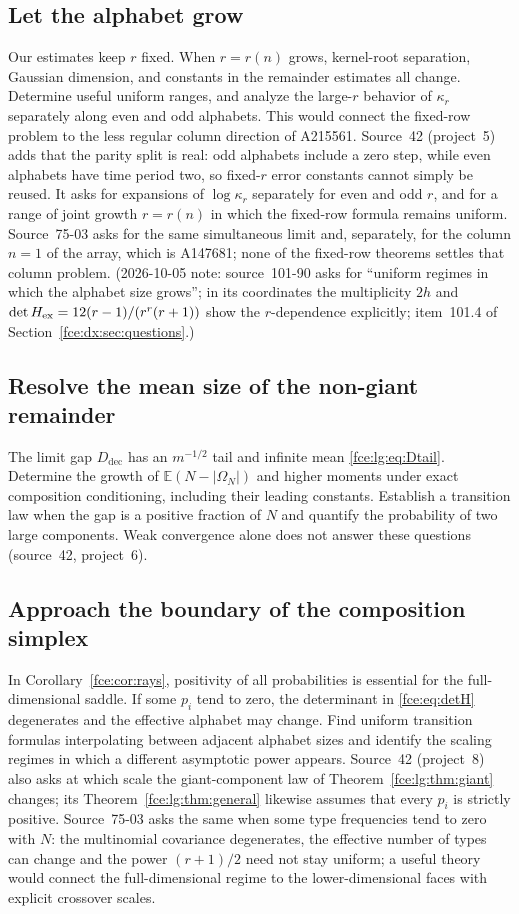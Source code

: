 \documentclass[11pt,a4paper]{article}
\numberwithin{equation}{section}
\theoremstyle{definition}\newtheorem{definition}[theorem]{Definition}
\theoremstyle{remark}\newtheorem{remark}[theorem]{Remark}
\newcommand{\Exp}{\mathbb E}
\begin{document}
\subsection{Let the alphabet grow}
Our estimates keep $r$ fixed. When $r=r(n)$ grows, kernel-root separation,
Gaussian dimension, and constants in the remainder estimates all change.
Determine useful uniform ranges, and analyze the large-$r$ behavior of
$\kappa_r$ separately along even and odd alphabets. This would connect the
fixed-row problem to the less regular column direction of A215561.
Source~42 (project~5) adds that the parity split is real: odd alphabets
include a zero step, while even alphabets have time period two, so
fixed-$r$ error constants cannot simply be reused. It asks for expansions
of $\log\kappa_r$ separately for even and odd $r$, and for a range of joint
growth $r=r(n)$ in which the fixed-row formula remains uniform.
Source~75-03 asks for the same simultaneous limit and, separately, for the
column $n=1$ of the array, which is A147681; none of the fixed-row theorems
settles that column problem. (2026-10-05 note: source~101-90 asks for ``uniform
regimes in which the alphabet size grows''; in its coordinates the
multiplicity $2h$ and $\det H_{\rm ex}=12(r-1)/(r^r(r+1))$ show the
$r$-dependence explicitly; item~101.4 of
Section~\ref{fce:dx:sec:questions}.)

\subsection{Resolve the mean size of the non-giant remainder}
The limit gap $D_{\mathrm{dec}}$ has an $m^{-1/2}$ tail and infinite mean
\eqref{fce:lg:eq:Dtail}. Determine the growth of $\Exp(N-|\Omega_N|)$ and
higher moments under exact composition conditioning, including their
leading constants. Establish a transition law when the gap is a positive
fraction of $N$ and quantify the probability of two large components.
Weak convergence alone does not answer these questions (source~42,
project~6).

\subsection{Approach the boundary of the composition simplex}
In Corollary~\ref{fce:cor:rays}, positivity of all probabilities is essential
for the full-dimensional saddle. If some $p_i$ tend to zero, the determinant
in \eqref{fce:eq:detH} degenerates and the effective alphabet may change.
Find uniform transition formulas interpolating between adjacent alphabet
sizes and identify the scaling regimes in which a different asymptotic
power appears. Source~42 (project~8) also asks at which scale the
giant-component law of Theorem~\ref{fce:lg:thm:giant} changes; its
Theorem~\ref{fce:lg:thm:general} likewise assumes that every $p_i$ is
strictly positive. Source~75-03 asks the same when some type frequencies
tend to zero with $N$: the multinomial covariance degenerates, the
effective number of types can change and the power $(r+1)/2$ need not stay
uniform; a useful theory would connect the full-dimensional regime to the
lower-dimensional faces with explicit crossover scales.
\end{document}
